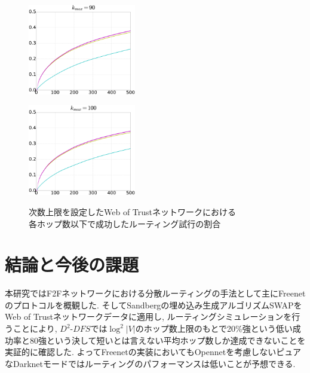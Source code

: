\documentclass[dvipdfmx]{ampbt}
\begin{document}
\begin{figure}[htbp]
\begin{minipage}{0.33\hsize}
\begin{center}
     \end{center}
     \label{fig:32}
    \end{minipage}\begin{minipage}{0.33\hsize}
     \begin{center}
      \includegraphics[width=47mm]{../fig/cml_90clip.eps}
     \end{center}
     \label{fig:33}
    \end{minipage}
    \begin{center}
     \begin{minipage}{0.33\hsize}
      \centerline{\includegraphics[width=47mm]{../fig/cml_100clip.eps}}
      \label{fig:41}
     \end{minipage}
    \end{center}

    \caption{次数上限を設定したWeb of Trustネットワークにおける \\ 各ホップ数以下で成功したルーティング試行の割合}
    \label{fig:cml_dclip}
   \end{figure}


\section{結論と今後の課題}
本研究ではF2Fネットワークにおける分散ルーティングの手法として主にFreenetのプロトコルを概観した. そしてSandbergの埋め込み生成アルゴリズムSWAPをWeb of Trustネットワークデータに適用し, ルーティングシミュレーションを行うことにより, $D^2$-$DFS$では$\log^2|V|$のホップ数上限のもとで20\%強という低い成功率と80強という決して短いとは言えない平均ホップ数しか達成できないことを実証的に確認した. よってFreenetの実装においてもOpennetを考慮しないピュアなDarknetモードではルーティングのパフォーマンスは低いことが予想できる.
\end{document}

